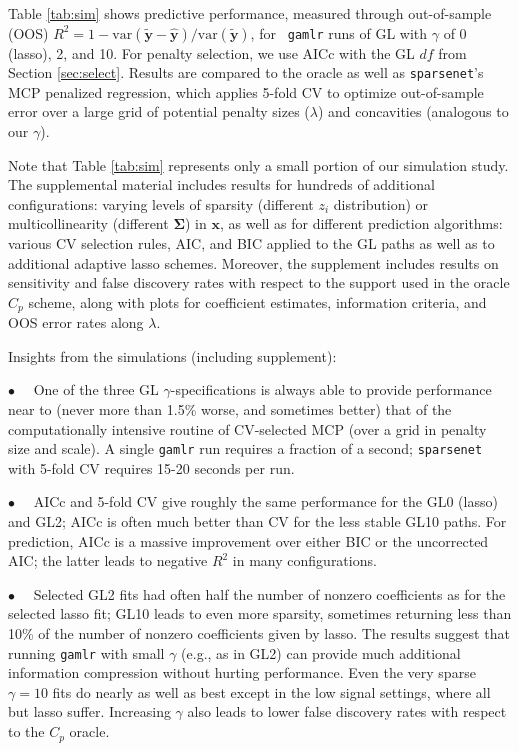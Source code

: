 \documentclass[12pt]{article}
\newcommand{\bs}[1]{\boldsymbol{#1}}
\newcommand{\mr}[1]{\mathrm{#1}}
\newcommand{\bm}[1]{\mathbf{#1}}
\begin{document}
Table \ref{tab:sim} shows  predictive performance, 
measured through out-of-sample (OOS) $R^2 = 1 -
\mr{var}(\bm{\tilde y} - \bm{\hat y})/\mr{var}(\bm{\tilde y})$, for {\tt
gamlr} runs of GL with $\gamma$ of 0 (lasso), 2, and 10. For penalty
selection, we use AICc with the GL $df$ from Section \ref{sec:select}. Results
are compared to the oracle as well as {\tt sparsenet}'s MCP penalized
regression, which applies 5-fold CV to optimize out-of-sample error over a
large grid of potential penalty sizes ($\lambda$) and concavities (analogous
to our $\gamma$).


Note that Table \ref{tab:sim} represents only a small portion of our
simulation study.  The supplemental material includes results for hundreds of
additional configurations: varying levels of sparsity (different $z_i$
distribution) or multicollinearity (different $\bs{\Sigma}$) in $\bm{x}$, as
well as for different prediction algorithms: various CV selection rules, AIC,
and BIC applied to the GL paths as well as to additional adaptive lasso
schemes.  Moreover, the supplement includes results on sensitivity and false
discovery rates with respect to the support used in the oracle $C_p$ scheme,
along with  plots for coefficient estimates, information criteria,
and OOS error rates along $\lambda$.

Insights from the simulations (including supplement):

$\bullet$~~ One of the three GL $\gamma$-specifications is always able to provide performance near to (never more than 1.5\% worse, and sometimes better) that of the computationally intensive routine of CV-selected MCP (over a grid in penalty size and scale).  A single {\tt gamlr} run requires a fraction of a second; {\tt sparsenet} with 5-fold CV requires 15-20 seconds per run.  

$\bullet$~~  AICc and 5-fold CV give roughly the same performance for the GL0 (lasso) and GL2; AICc is often much better than CV for the less stable GL10 paths.  For prediction, AICc is a massive improvement over either BIC or the uncorrected AIC;  the
latter leads to negative $R^2$ in many configurations.

$\bullet$~~  Selected GL2 fits had often half the number of nonzero
coefficients as for the selected lasso fit; GL10 leads to even more sparsity,
sometimes returning less than 10\% of the number of nonzero coefficients given by
lasso.  The results suggest that running {\tt gamlr} with small $\gamma$
(e.g., as in GL2) can provide much additional information compression without
hurting performance.  Even the very sparse $\gamma=10$ fits do nearly as well
as best except in the low signal settings, where all but lasso suffer.
Increasing $\gamma$ also leads to lower false discovery rates with respect to
the $C_p$ oracle.
\end{document}
